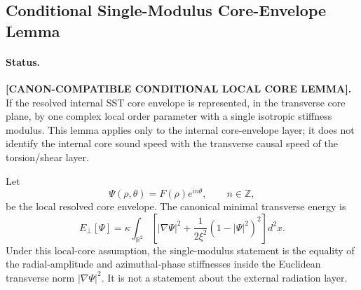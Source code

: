 \subsection{Conditional Single-Modulus Core-Envelope Lemma}
\label{subsec:canon_single_modulus_core_envelope}

\paragraph{Status.}
\textbf{[CANON-COMPATIBLE CONDITIONAL LOCAL CORE LEMMA].}  If the resolved internal SST core
envelope is represented, in the transverse core plane, by one complex local
order parameter with a single isotropic stiffness modulus.  This lemma applies
only to the internal core-envelope layer; it does not identify the internal
core sound speed with the transverse causal speed of the torsion/shear layer.

Let
\begin{equation}
    \Psi(\rho,\theta)=F(\rho)e^{in\theta},
    \qquad n\in\mathbb Z,
\end{equation}
be the local resolved core envelope.  The canonical minimal transverse energy
is
\begin{equation}
    E_\perp[\Psi]
    =
    \kappa\int_{\mathbb R^2}
    \left[
        |\nabla\Psi|^2
        +\frac{1}{2\xi^2}(1-|\Psi|^2)^2
    \right]d^2x .
    \label{eq:canon_single_modulus_core_energy}
\end{equation}
Under this local-core assumption, the single-modulus statement is the equality of the radial-amplitude and
azimuthal-phase stiffnesses inside the Euclidean transverse norm
\(|\nabla\Psi|^2\).  It is not a statement about the external radiation layer.

